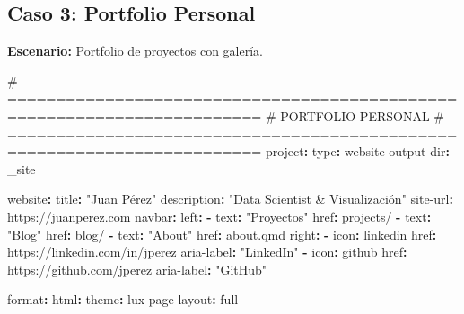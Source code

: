 \documentclass[
  doc,
  floatsintext,
  longtable,
  a4paper,
  nolmodern,
  notxfonts,
  notimes,
  12pt,
  colorlinks=true,linkcolor=blue,citecolor=blue,urlcolor=blue]{apa7}
\newenvironment{Shaded}{\begin{snugshade}}{\end{snugshade}}
\newcommand{\AttributeTok}[1]{\textcolor[rgb]{0.40,0.45,0.13}{#1}}
\newcommand{\CommentTok}[1]{\textcolor[rgb]{0.37,0.37,0.37}{#1}}
\newcommand{\FunctionTok}[1]{\textcolor[rgb]{0.28,0.35,0.67}{#1}}
\newcommand{\KeywordTok}[1]{\textcolor[rgb]{0.00,0.23,0.31}{\textbf{#1}}}
\newcommand{\StringTok}[1]{\textcolor[rgb]{0.13,0.47,0.30}{#1}}
\begin{document}
\subsection{Caso 3: Portfolio Personal}\label{caso-3-portfolio-personal}

\textbf{Escenario:} Portfolio de proyectos con galería.

\begin{Shaded}
\begin{Highlighting}[]
\CommentTok{\# ========================================================================}
\CommentTok{\# PORTFOLIO PERSONAL}
\CommentTok{\# ========================================================================}
\FunctionTok{project}\KeywordTok{:}
\AttributeTok{  }\FunctionTok{type}\KeywordTok{:}\AttributeTok{ website}
\AttributeTok{  }\FunctionTok{output{-}dir}\KeywordTok{:}\AttributeTok{ \_site}

\FunctionTok{website}\KeywordTok{:}
\AttributeTok{  }\FunctionTok{title}\KeywordTok{:}\AttributeTok{ }\StringTok{"Juan Pérez"}
\AttributeTok{  }\FunctionTok{description}\KeywordTok{:}\AttributeTok{ }\StringTok{"Data Scientist \& Visualización"}
\AttributeTok{  }\FunctionTok{site{-}url}\KeywordTok{:}\AttributeTok{ https://juanperez.com}
\AttributeTok{  }
\AttributeTok{  }\FunctionTok{navbar}\KeywordTok{:}
\AttributeTok{    }\FunctionTok{left}\KeywordTok{:}
\AttributeTok{      }\KeywordTok{{-}}\AttributeTok{ }\FunctionTok{text}\KeywordTok{:}\AttributeTok{ }\StringTok{"Proyectos"}
\AttributeTok{        }\FunctionTok{href}\KeywordTok{:}\AttributeTok{ projects/}
\AttributeTok{      }\KeywordTok{{-}}\AttributeTok{ }\FunctionTok{text}\KeywordTok{:}\AttributeTok{ }\StringTok{"Blog"}
\AttributeTok{        }\FunctionTok{href}\KeywordTok{:}\AttributeTok{ blog/}
\AttributeTok{      }\KeywordTok{{-}}\AttributeTok{ }\FunctionTok{text}\KeywordTok{:}\AttributeTok{ }\StringTok{"About"}
\AttributeTok{        }\FunctionTok{href}\KeywordTok{:}\AttributeTok{ about.qmd}
\AttributeTok{    }\FunctionTok{right}\KeywordTok{:}
\AttributeTok{      }\KeywordTok{{-}}\AttributeTok{ }\FunctionTok{icon}\KeywordTok{:}\AttributeTok{ linkedin}
\AttributeTok{        }\FunctionTok{href}\KeywordTok{:}\AttributeTok{ https://linkedin.com/in/jperez}
\AttributeTok{        }\FunctionTok{aria{-}label}\KeywordTok{:}\AttributeTok{ }\StringTok{"LinkedIn"}
\AttributeTok{      }\KeywordTok{{-}}\AttributeTok{ }\FunctionTok{icon}\KeywordTok{:}\AttributeTok{ github}
\AttributeTok{        }\FunctionTok{href}\KeywordTok{:}\AttributeTok{ https://github.com/jperez}
\AttributeTok{        }\FunctionTok{aria{-}label}\KeywordTok{:}\AttributeTok{ }\StringTok{"GitHub"}

\FunctionTok{format}\KeywordTok{:}
\AttributeTok{  }\FunctionTok{html}\KeywordTok{:}
\AttributeTok{    }\FunctionTok{theme}\KeywordTok{:}\AttributeTok{ lux}
\AttributeTok{    }\FunctionTok{page{-}layout}\KeywordTok{:}\AttributeTok{ full}
\end{Highlighting}
\end{Shaded}
\end{document}
